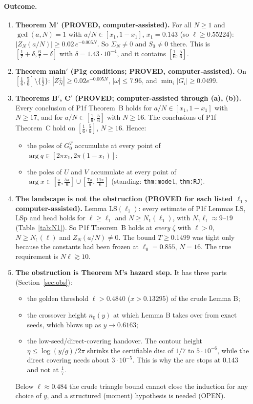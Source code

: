 \documentclass[11pt]{article}
\theoremstyle{remark}\newtheorem{remark}[theorem]{Remark}
\begin{document}
\paragraph{Outcome.}
\begin{enumerate}
\item[(a)] \textbf{Theorem M$'$ (PROVED, computer-assisted).} For all $N\ge1$ and $\gcd(a,N)=1$ with $a/N\in[x_1,1-x_1]$, $x_1=0.143$ (so $\ell\ge0.55224$): $|Z_N(a/N)|\ge0.02\,e^{-0.005N}$. So $\Sigma_N\ne0$ and $S_0\ne0$ there. This is $[\frac17+\delta,\frac67-\delta]$ with $\delta=1.43\cdot10^{-4}$, and it contains $[\frac16,\frac56]$.
\item[(b)] \textbf{Theorem main$'$ (P1g conditions; PROVED, computer-assisted).} On $[\frac16,\frac56]\setminus\{\frac12\}$: $|Z^\pm_N|\ge0.02e^{-0.005N}$, $|\omega|\le7.96$, and $\min_i|G_i|\ge0.0499$.
\item[(c)] \textbf{Theorems B$'$, C$'$ (PROVED; computer-assisted through (a), (b)).} Every conclusion of P1f Theorem~B holds for $a/N\in[x_1,1-x_1]$ with $N\ge17$, and for $a/N\in[\frac16,\frac56]$ with $N\ge16$. The conclusions of P1f Theorem~C hold on $[\frac16,\frac56]$, $N\ge16$. Hence:
 \begin{itemize}
 \item the poles of $G^T_0$ accumulate at every point of $\arg q\in[2\pi x_1,2\pi(1-x_1)]$;
 \item the poles of $U$ and $V$ accumulate at every point of $\arg x\in[\frac\pi6,\frac{5\pi}6]\cup[\frac{7\pi}6,\frac{11\pi}6]$ (standing: \texttt{thm:model}, \texttt{thm:RJ}).
 \end{itemize}
\item[(d)] \textbf{The landscape is not the obstruction (PROVED for each listed $\ell_1$, computer-assisted).} Lemma LS$(\ell_1)$: every estimate of P1f Lemmas LS, LSp and head holds for $\ell\ge\ell_1$ and $N\ge N_1(\ell_1)$, with $N_1\ell_1\approx9$--$19$ (Table~\ref{tab:N1}). So P1f Theorem~B holds at \emph{every} $\zeta$ with $\ell>0$, $N\ge N_1(\ell)$ and $Z_N(a/N)\ne0$. The bound $T\ge0.1499$ was tight only because the constants had been frozen at $\ell_0=0.855$, $N=16$. The true requirement is $N\ell\gtrsim10$.
\item[(e)] \textbf{The obstruction is Theorem M's hazard step.} It has three parts (Section~\ref{sec:obs}):
 \begin{itemize}
 \item the golden threshold $\ell>0.4840$ ($x>0.13295$) of the crude Lemma B;
 \item the crossover height $n_0(y)$ at which Lemma B takes over from exact seeds, which blows up as $y\to0.6163$;
 \item the low-seed/direct-covering handover. The contour height $\eta\le\log(y/g)/2\pi$ shrinks the certifiable disc of $1/7$ to $5\cdot10^{-6}$, while the direct covering needs about $3\cdot10^{-5}$. This is why the arc stops at $0.143$ and not at $\frac17$.
 \end{itemize}
 Below $\ell\approx0.484$ the crude triangle bound cannot close the induction for any choice of $y$, and a structured (moment) hypothesis is needed (OPEN).
\end{enumerate}
\end{document}
